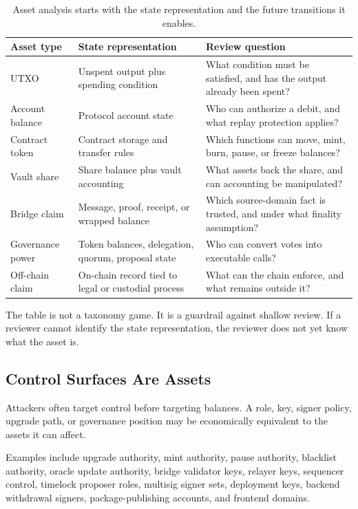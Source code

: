 \begin{table}[htbp]
\centering
\small
\renewcommand{\arraystretch}{1.18}
\begin{tabularx}{\textwidth}{@{}>{\RaggedRight\arraybackslash}p{}>{\RaggedRight\arraybackslash}p{}X@{}}
\toprule
Asset type & State representation & Review question \\
\midrule
UTXO & Unspent output plus spending condition & What condition must be satisfied, and has the output already been spent? \\
Account balance & Protocol account state & Who can authorize a debit, and what replay protection applies? \\
Contract token & Contract storage and transfer rules & Which functions can move, mint, burn, pause, or freeze balances? \\
Vault share & Share balance plus vault accounting & What assets back the share, and can accounting be manipulated? \\
Bridge claim & Message, proof, receipt, or wrapped balance & Which source-domain fact is trusted, and under what finality assumption? \\
Governance power & Token balances, delegation, quorum, proposal state & Who can convert votes into executable calls? \\
Off-chain claim & On-chain record tied to legal or custodial process & What can the chain enforce, and what remains outside it? \\
\bottomrule
\end{tabularx}
\caption{Asset analysis starts with the state representation and the future transitions it enables.}
\end{table}

The table is not a taxonomy game. It is a guardrail against shallow review. If a reviewer cannot identify the state representation, the reviewer does not yet know what the asset is.

\subsection{Control Surfaces Are Assets}

Attackers often target control before targeting balances. A role, key, signer policy, upgrade path, or governance position may be economically equivalent to the assets it can affect.

Examples include upgrade authority, mint authority, pause authority, blacklist authority, oracle update authority, bridge validator keys, relayer keys, sequencer control, timelock proposer roles, multisig signer sets, deployment keys, backend withdrawal signers, package-publishing accounts, and frontend domains.


